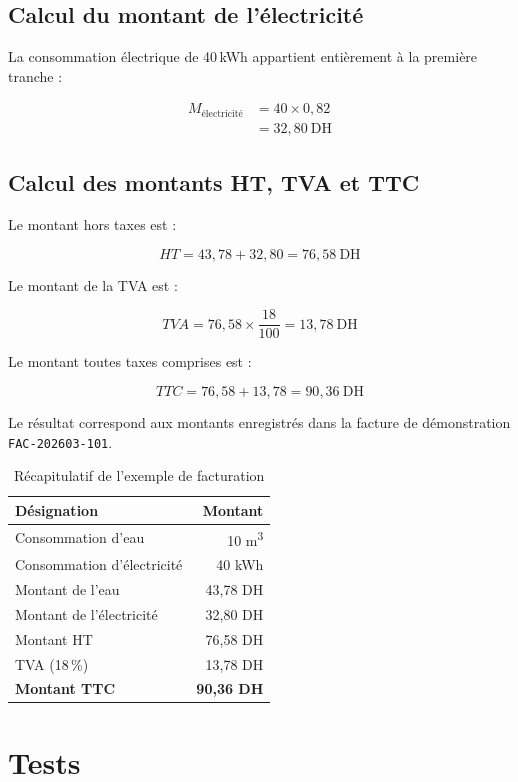 \subsection*{Calcul du montant de l'électricité}

La consommation électrique de 40\,kWh appartient entièrement à la première tranche :

\[
\begin{aligned}
M_{\text{électricité}} & = 40 \times 0,82 \\
                       & = 32,80\ \text{DH}
\end{aligned}
\]

\subsection*{Calcul des montants HT, TVA et TTC}

Le montant hors taxes est :

\[
HT = 43,78 + 32,80 = 76,58\ \text{DH}
\]

Le montant de la TVA est :

\[
TVA = 76,58 \times \frac{18}{100}
     = 13,78\ \text{DH}
\]

Le montant toutes taxes comprises est :

\[
TTC = 76,58 + 13,78 = 90,36\ \text{DH}
\]

Le résultat correspond aux montants enregistrés dans la facture de démonstration \texttt{FAC-202603-101}.

\begin{table}[H]
\centering
\caption{Récapitulatif de l'exemple de facturation}
\begin{tabular}{lr}
\toprule
\textbf{Désignation} & \textbf{Montant} \\
\midrule
Consommation d'eau & 10 m\textsuperscript{3} \\
Consommation d'électricité & 40 kWh \\
Montant de l'eau & 43,78 DH \\
Montant de l'électricité & 32,80 DH \\
Montant HT & 76,58 DH \\
TVA (18\,\%) & 13,78 DH \\
\textbf{Montant TTC} & \textbf{90,36 DH} \\
\bottomrule
\end{tabular}
\end{table}

\section{Tests}

